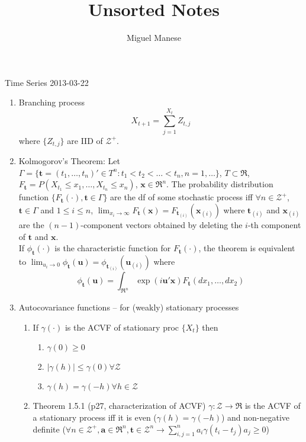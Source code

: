\documentclass{article}
\title{Unsorted Notes}
\author{Miguel Manese}
\date{}
\newcommand{\Int}{\mathcal{Z}}
\begin{document}
\maketitle

\begin{section}{Time Series 2013-03-22}
\begin{enumerate}
\item Branching process
  \[ X_{t+1} = \sum_{j=1}^{X_t} Z_{t,j} \]
  where $\{Z_{t,j}\}$ are IID of $\Int^+$.
\item Kolmogorov's Theorem: Let 
  $\Gamma = \{\mathbf{t} = (t_1, \ldots, t_n)' \in T^n :
     t_1 < t_2 < \ldots < t_n, n = 1, \ldots \}$, $T \subset \Re$,
  $F_{\mathbf{t}} = P(X_{t_1} \leq x_1, \ldots, X_{t_n} \leq x_n)$,
  $\mathbf{x} \in \Re^n$. The probability distribution function
  $\{F_{\mathbf{t}}(\cdot), \mathbf{t} \in \Gamma\}$ are the df of some
  stochastic process iff $\forall n \in \Int^+$, 
  $\mathbf{t} \in \Gamma$ and $1 \leq i \leq n$, 
  $\lim_{x_i \to \infty} F_{\mathbf{t}}(\mathbf{x}) = 
     F_{\mathbf{t}_{(i)}}(\mathbf{x}_{(i)})$ where $\mathbf{t}_{(i)}$ and
  $\mathbf{x}_{(i)}$ are the $(n-1)$-component vectors obtained by deleting
  the $i$-th component of $\mathbf{t}$ and $\mathbf{x}$.\\

  If $\phi_{\mathbf{t}}(\cdot)$ is the characteristic function for 
  $F_{\mathbf{t}}(\cdot)$, the theorem is equivalent to
  $\lim_{u_i \to 0} \phi_{\mathbf{t}}(\mathbf{u}) = 
    \phi_{\mathbf{t}_{(i)}}(\mathbf{u}_{(i)})$ where 
  \[\phi_{\mathbf{t}}(\mathbf{u}) = \int_{\Re^n} \exp(i \mathbf{u}'\mathbf{x})
     F_{\mathbf{t}}(dx_1, \ldots, dx_2)\]
\item Autocovariance functions -- for (weakly) stationary processes
  \begin{enumerate}
  \item If $\gamma(\cdot)$ is the ACVF of stationary proc $\{X_t\}$ then
    \begin{enumerate}
    \item $\gamma(0) \geq 0$
    \item $|\gamma(h)| \leq \gamma(0) \forall \Int$
    \item $\gamma(h) = \gamma(-h) \forall h \in \Int$
    \end{enumerate}
  \item Theorem 1.5.1 (p27, characterization of ACVF) 
  \label{brockwell:thm:1.5.1}
  $\gamma : \Int \to \Re$ is the ACVF of a stationary process iff
  it is even ($\gamma(h) = \gamma(-h)$) and non-negative definite
  ($\forall n \in \Int^+, \mathbf{a} \in \Re^n, \mathbf{t} \in \Int^n 
   \to \sum_{i,j=1}^n a_i \gamma(t_i - t_j) a_j \geq 0$)
  \end{enumerate}
\end{enumerate}
\end{section}
\end{document}
